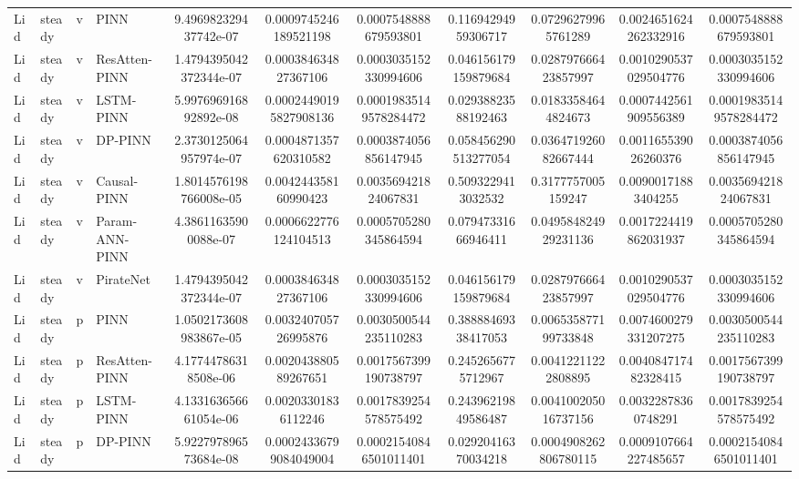 \begin{landscape}
\begin{table}[p]
{\begin{tabular}{llllccccccc}
Lid & steady &     v &           PINN &  9.496982329437742e-07 &  0.0009745246189521198 &  0.0007548888679593801 &  0.11694294959306717 &   0.07296279965761289 & 0.0024651624262332916 &  0.0007548888679593801 \\
Lid & steady &     v &  ResAtten-PINN & 1.4794395042372344e-07 &   0.000384634827367106 &  0.0003035152330994606 & 0.046156179159879684 &  0.028797666423857997 & 0.0010290537029504776 &  0.0003035152330994606 \\
Lid & steady &     v &      LSTM-PINN &  5.997696916892892e-08 & 0.00024490195827908136 & 0.00019835149578284472 &  0.02938823588192463 &   0.01833584644824673 & 0.0007442561909556389 & 0.00019835149578284472 \\
Lid & steady &     v &        DP-PINN & 2.3730125064957974e-07 &  0.0004871357620310582 &  0.0003874056856147945 & 0.058456290513277054 &  0.036471926082667444 &  0.001165539026260376 &  0.0003874056856147945 \\
Lid & steady &     v &    Causal-PINN & 1.8014576198766008e-05 &   0.004244358160990423 &   0.003569421824067831 &   0.5093229413032532 &    0.3177757005159247 &   0.00900171883404255 &   0.003569421824067831 \\
Lid & steady &     v & Param-ANN-PINN &   4.38611635900088e-07 &  0.0006622776124104513 &  0.0005705280345864594 &  0.07947331666946411 &  0.049584824929231136 & 0.0017224419862031937 &  0.0005705280345864594 \\
Lid & steady &     v &      PirateNet & 1.4794395042372344e-07 &   0.000384634827367106 &  0.0003035152330994606 & 0.046156179159879684 &  0.028797666423857997 & 0.0010290537029504776 &  0.0003035152330994606 \\
Lid & steady &     p &           PINN & 1.0502173608983867e-05 &   0.003240705726995876 &  0.0030500544235110283 &  0.38888469338417053 &  0.006535877199733848 & 0.0074600279331207275 &  0.0030500544235110283 \\
Lid & steady &     p &  ResAtten-PINN &   4.17744786318508e-06 &   0.002043880589267651 &  0.0017567399190738797 &   0.2452656775712967 &   0.00412211222808895 &  0.004084717482328415 &  0.0017567399190738797 \\
Lid & steady &     p &      LSTM-PINN &  4.133163656661054e-06 &    0.00203301836112246 &  0.0017839254578575492 &  0.24396219849586487 &  0.004100205016737156 &   0.00322878360748291 &  0.0017839254578575492 \\
Lid & steady &     p &        DP-PINN &  5.922797896573684e-08 & 0.00024336799084049004 & 0.00021540846501011401 &  0.02920416370034218 & 0.0004908262806780115 & 0.0009107664227485657 & 0.00021540846501011401 \\

\end{tabular}}
\end{table}
\end{landscape}
